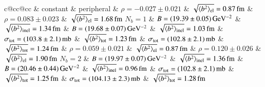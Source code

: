 \begin{table}
\caption{%
Parameters derived from the parameter-comparison fits presented in Figures~\ref{fig:fits common con} and \ref{fig:fits common per}. The rows correspond to different numbers of parameters in the nuclear modulus exponent. The left-hand (right-hand) side columns refer to fits with constant, Eq.~(\ref{eq:nuc phase con}), (peripheral, Eq.~\ref{eq:nuc phase per}) nuclear phase. The RMS values of impact parameter $b$ correspond to elastic (el), inelastic (inel) and any (tot) collisions. The combination $N_b = 1$ with constant phase is set in gray as it is excluded by data, see Figure~\ref{fig:fits common con}.
}%
\vskip-3mm
\label{tab:fits common}
\begin{center}
\small
\setlength{\tabcolsep}{5pt}
\begin{tabular}{c@{\hskip20pt}cc@{\hskip20pt}cc}
\hline
\hline
	& \hfil constant \hfil & \hfil peripheral \hfil  \cr
\hline
 			& \color{gray}$\rho = -0.027 \pm 0.021$ & \color{gray}$\sqrt{\langle b^2\rangle_{\rm el}} = 0.87\,{\rm fm}$					& $\rho = 0.083 \pm 0.023$ & $\sqrt{\langle b^2\rangle_{\rm el}} = 1.68\,{\rm fm}$					\cr
$N_b = 1$	& \color{gray}$B = (19.39 \pm 0.05)\,{\rm GeV^{-2}}$ & \color{gray}$\sqrt{\langle b^2\rangle_{\rm inel}} = 1.34\,{\rm fm}$		& $B = (19.68 \pm 0.07)\,{\rm GeV^{-2}}$ & $\sqrt{\langle b^2\rangle_{\rm inel}} = 1.03\,{\rm fm}$		\cr
			& \color{gray}$\sigma_{\rm tot} = (103.8 \pm 2.1)\,{\rm mb}$ & \color{gray}$\sqrt{\langle b^2\rangle_{\rm tot}} = 1.23\,{\rm fm}$	& $\sigma_{\rm tot} = (102.8 \pm 2.1)\,{\rm mb}$ & $\sqrt{\langle b^2\rangle_{\rm tot}} = 1.24\,{\rm fm}$	\cr\hline
%                                                                                                                                                                                                                   
 			& $\rho = 0.059 \pm 0.021$ & $\sqrt{\langle b^2\rangle_{\rm el}} = 0.87\,{\rm fm}$						& $\rho = 0.120 \pm 0.026$ & $\sqrt{\langle b^2\rangle_{\rm el}} = 1.90\,{\rm fm}$						\cr
$N_b = 2$	& $B = (19.97 \pm 0.07)\,{\rm GeV^{-2}}$ & $\sqrt{\langle b^2\rangle_{\rm inel}} = 1.36\,{\rm fm}$		& $B = (20.46 \pm 0.44)\,{\rm GeV^{-2}}$ & $\sqrt{\langle b^2\rangle_{\rm inel}} = 0.96\,{\rm fm}$		\cr
			& $\sigma_{\rm tot} = (102.8 \pm 2.1)\,{\rm mb}$ & $\sqrt{\langle b^2\rangle_{\rm tot}} = 1.25\,{\rm fm}$	& $\sigma_{\rm tot} = (104.13 \pm 2.3)\,{\rm mb}$ & $\sqrt{\langle b^2\rangle_{\rm tot}} = 1.28\,{\rm fm}$	\cr\hline
%                                                                                                                                                                                                                   

\end{tabular}
\end{center}
\end{table}
